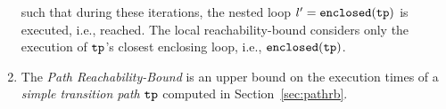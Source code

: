 \begin{enumerate}
    such that during these iterations, the nested loop $l' = \mathtt{enclosed(\mathtt{tp})}$ is executed, i.e., reached.
    The local reachability-bound  considers only the execution of $\mathtt{tp}$'s closest enclosing loop, i.e., $\mathtt{enclosed}(\mathtt{tp})$.
    \item The \emph{Path Reachability-Bound} is an upper bound on the execution times of a \emph{simple transition path} $\mathtt{tp}$ computed in Section~\ref{sec:pathrb}.
\end{enumerate}